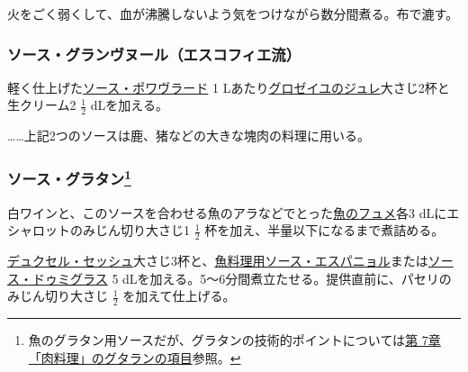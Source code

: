 \begin{recette}
火をごく弱くして、血が沸騰しないよう気をつけながら数分間煮る。布で漉す。

\atoaki{}

\hypertarget{sauce-grand-veneur-procede-escoffier}{%
\subsubsection{ソース・グランヴヌール（エスコフィエ流）}\label{sauce-grand-veneur-procede-escoffier}}



軽く仕上げた\protect\hyperlink{sauce-poivrade}{ソース・ポワヴラード} 1
Lあたり\protect\hyperlink{gelee-de-groseilles-a}{グロゼイユのジュレ}大さじ2杯と生クリーム2
\(\frac{1}{2}\) dLを加える。

\ldots{}\ldots{}上記2つのソースは鹿、猪などの大きな塊肉の料理に用いる。

\atoaki{}

\hypertarget{sauce-gratin}{%
\subsubsection[ソース・グラタン]{\texorpdfstring{ソース・グラタン\footnote{魚のグラタン用ソースだが、グラタンの技術的ポイントについては\protect\hyperlink{gratins}{第
  7章「肉料理」のグタランの項目}参照。}}{ソース・グラタン}}\label{sauce-gratin}}


 

白ワインと、このソースを合わせる魚のアラなどでとった\protect\hyperlink{fumet-de-poisson}{魚のフュメ}各3
dLにエシャロットのみじん切り大さじ1 \(\frac{1}{2}\)
杯を加え、半量以下になるまで煮詰める。

\protect\hyperlink{duxelles-seche}{デュクセル・セッシュ}大さじ3杯と、\protect\hyperlink{sauce-espagnole-maigre}{魚料理用ソース・エスパニョル}または\protect\hyperlink{sauce-demi-glace}{ソース・ドゥミグラス}
5 dLを加える。5〜6分間煮立たせる。提供直前に、パセリのみじん切り大さじ
\(\frac{1}{2}\) を加えて仕上げる。


\end{recette}
